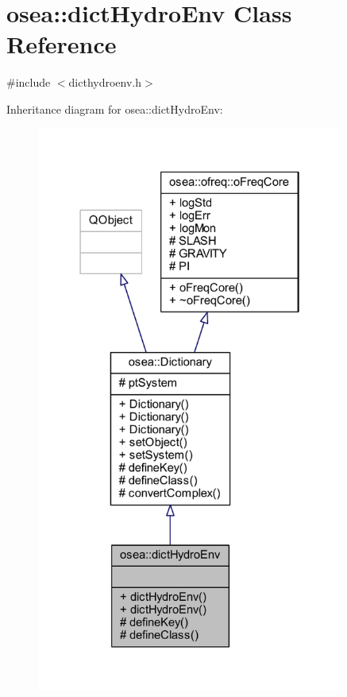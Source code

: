 \hypertarget{classosea_1_1dict_hydro_env}{\section{osea\-:\-:dict\-Hydro\-Env Class Reference}
\label{classosea_1_1dict_hydro_env}
}


{\ttfamily \#include $<$dicthydroenv.\-h$>$}



Inheritance diagram for osea\-:\-:dict\-Hydro\-Env\-:
\nopagebreak
\begin{figure}[H]
\begin{center}
\leavevmode
\includegraphics[width=286pt]{classosea_1_1dict_hydro_env__inherit__graph}
\end{center}
\end{figure}
